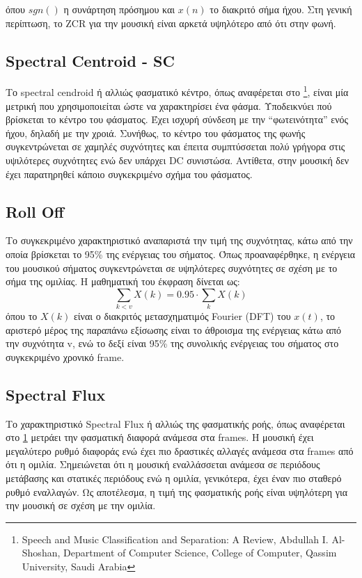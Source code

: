 όπου $sgn()$ η συνάρτηση πρόσημου και $x(n)$ το διακριτό σήμα ήχου. Στη γενική περίπτωση, το ZCR για την μουσική είναι αρκετά υψηλότερο από ότι στην φωνή.

\subsection{Spectral Centroid - SC}

Το spectral cendroid ή αλλιώς φασματικό κέντρο, όπως αναφέρεται στο \footnote{\label{Shoshan}
Speech and Music Classification and Separation: A Review, Abdullah I. Al-Shoshan, Department of Computer Science, College of Computer, Qassim University, Saudi Arabia}, είναι μία μετρική που χρησιμοποιείται ώστε να χαρακτηρίσει ένα φάσμα. Υποδεικνύει πού βρίσκεται το κέντρο του φάσματος. Έχει ισχυρή σύνδεση με την ``φωτεινότητα'' ενός ήχου, δηλαδή με την χροιά. Συνήθως, το κέντρο του φάσματος της φωνής συγκεντρώνεται σε χαμηλές συχνότητες και έπειτα συμπτύσσεται πολύ γρήγορα στις υψιλότερες συχνότητες ενώ δεν υπάρχει DC συνιστώσα. Αντίθετα, στην μουσική δεν έχει παρατηρηθεί κάποιο συγκεκριμένο σχήμα του φάσματος.

\subsection{Roll Off}

Το συγκεκριμένο χαρακτηριστικό αναπαριστά την τιμή της συχνότητας, κάτω από την οποία βρίσκεται το 95\% της ενέργειας του σήματος. Όπως προαναφέρθηκε, η ενέργεια του μουσικού σήματος συγκεντρώνεται σε υψηλότερες συχνότητες σε σχέση με το σήμα της ομιλίας. Η μαθηματική του έκφραση δίνεται ως:
\begin{equation}
\sum_{k<v} X(k) = 0.95 \cdot \sum_{k}X(k)
\end{equation}
όπου το $X(k)$ είναι ο διακριτός μετασχηματιμός Fourier (DFT) του $x(t)$, το αριστερό μέρος της παραπάνω εξίσωσης είναι το άθροισμα της ενέργειας κάτω από την συχνότητα v, ενώ το δεξί είναι 95\% της συνολικής ενέργειας του σήματος στο συγκεκριμένο χρονικό frame.

\subsection{Spectral Flux}

Το χαρακτηριστικό Spectral Flux ή αλλιώς της φασματικής ροής, όπως αναφέρεται στο \cref{Shoshan} μετράει την φασματική διαφορά ανάμεσα στα frames. Η μουσική έχει μεγαλύτερο ρυθμό διαφοράς ενώ έχει πιο δραστικές αλλαγές ανάμεσα στα frames από ότι η ομιλία. Σημειώνεται ότι η μουσική εναλλάσσεται ανάμεσα σε περιόδους μετάβασης και στατικές περιόδους ενώ η ομιλία, γενικότερα, έχει έναν πιο σταθερό ρυθμό εναλλαγών. Ως αποτέλεσμα, η τιμή της φασματικής ροής είναι υψηλότερη για την μουσική σε σχέση με την ομιλία.

